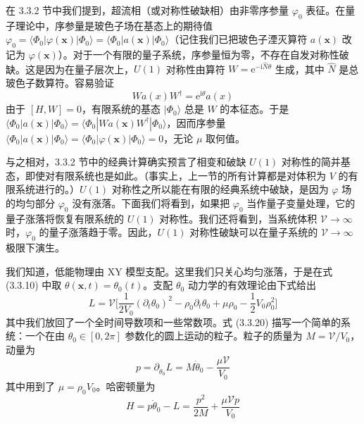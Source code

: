 
在 3.3.2 节中我们提到，超流相（或对称性破缺相）由非零序参量 $\varphi_0$ 表征。在量子理论中，序参量是玻色子场在基态上的期待值 $\varphi_0=\langle\Phi_0|\varphi(\pmb{x})|\Phi_0\rangle=\langle\Phi_0|a(\pmb{x})|\Phi_0\rangle$（记住我们已把玻色子湮灭算符 $a(\pmb{x})$ 改记为 $\varphi(\pmb{x})$）。对于一个有限的量子系统，序参量恒为零，不存在自发对称性破缺。这是因为在量子层次上，$U(1)$ 对称性由算符 $W=\mathrm{e}^{-\mathrm{i}\hat{N}\theta}$ 生成，其中 $\hat{N}$ 是总玻色子数算符。容易验证
\begin{equation*}
Wa(x)W^{\dagger}=\mathrm{e}^{\mathrm{i}\theta}a(x) \tag{3.3.19}
\end{equation*}
由于 $[H,W]=0$，有限系统的基态 $|\Phi_0\rangle$ 总是 $W$ 的本征态。于是 $\langle\Phi_0|a(\pmb{x})|\Phi_0\rangle=\langle\Phi_0|Wa(\pmb{x})W^{\dagger}|\Phi_0\rangle$，因而序参量 $\langle\Phi_0|a(\pmb{x})|\Phi_0\rangle=\langle\Phi_0|\varphi(\pmb{x})|\Phi_0\rangle=0$，无论 $\mu$ 取何值。

与之相对，3.3.2 节中的经典计算确实预言了相变和破缺 $U(1)$ 对称性的简并基态，即使对有限系统也是如此。（事实上，上一节的所有计算都是对体积为 $V$ 的有限系统进行的。）$U(1)$ 对称性之所以能在有限的经典系统中破缺，是因为 $\varphi$ 场的均匀部分 $\varphi_0$ 没有涨落。下面我们将看到，如果把 $\varphi_0$ 当作量子变量处理，它的量子涨落将恢复有限系统的 $U(1)$ 对称性。我们还将看到，当系统体积 $\mathcal{V}\to\infty$ 时，$\varphi_0$ 的量子涨落趋于零。因此，$U(1)$ 对称性破缺可以在量子系统的 $\mathcal{V}\to\infty$ 极限下演生。

我们知道，低能物理由 XY 模型支配。这里我们只关心均匀涨落，于是在式 (3.3.10) 中取 $\theta(\pmb{x},t)=\theta_0(t)$。支配 $\theta_0$ 动力学的有效理论由下式给出
\begin{equation*}
L=\mathcal{V}\big[\frac{1}{2V_0}(\partial_t\theta_0)^2-\rho_0\partial_t\theta_0+\mu\rho_0-\frac{1}{2}V_0\rho_0^2\big] \tag{3.3.20}
\end{equation*}
其中我们放回了一个全时间导数项和一些常数项。式 (3.3.20) 描写一个简单的系统：一个在由 $\theta_0\in[0,2\pi]$ 参数化的圆上运动的粒子。粒子的质量为 $M=\mathcal{V}/V_0$，动量为
\begin{equation*}
p=\partial_{\dot{\theta}_0}L=M\dot{\theta}_0-\frac{\mu\mathcal{V}}{V_0} \tag{3.3.21}
\end{equation*}
其中用到了 $\mu=\rho_0V_0$。哈密顿量为
\begin{equation*}
H=p\dot{\theta}_0-L=\frac{p^2}{2M}+\frac{\mu\mathcal{V}p}{V_0}
\end{equation*}

